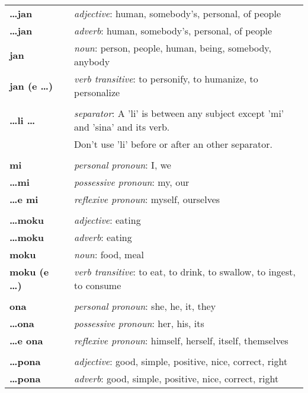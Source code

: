 \begin{supertabular}{p{2,5cm}|ll}
\textbf{\dots jan} && \textit{adjective}: human, somebody's, personal, of people \\ %
\textbf{\dots jan} && \textit{adverb}: human, somebody's, personal, of people \\ %
\textbf{jan} && \textit{noun}: person, people, human, being, somebody, anybody \\ %
\textbf{jan (e \dots)} && \textit{verb transitive}: to personify, to humanize, to personalize \\ %
 && \\ %
\textbf{\dots li \dots} && \textit{separator}: A 'li' is between any subject except 'mi' and 'sina' and its verb. \\ && Don't use 'li' before or after an other separator. \\ %
 && \\ %
\textbf{mi} && \textit{personal pronoun}: I, we  \\ 
\textbf{\dots mi} && \textit{possessive pronoun}: my, our \\  
\textbf{\dots e mi} && \textit{reflexive pronoun}: myself, ourselves  \\ 
 && \\ %
\textbf{\dots moku} && \textit{adjective}: eating \\ %
\textbf{\dots moku} && \textit{adverb}: eating \\ %
\textbf{moku} && \textit{noun}: food, meal \\ %
\textbf{moku (e \dots)} && \textit{verb transitive}: to eat, to drink, to swallow, to ingest, to consume \\ %
 && \\ %
\textbf{ona} && \textit{personal pronoun}: she, he, it, they \\ %
\textbf{\dots ona} && \textit{possessive pronoun}: her, his, its \\  %
\textbf{\dots e ona} && \textit{reflexive pronoun}: himself, herself, itself, themselves \\  
 && \\ %
\textbf{\dots pona} && \textit{adjective}: good, simple, positive, nice, correct, right \\ %
\textbf{\dots pona} && \textit{adverb}: good, simple, positive, nice, correct, right \\ %

\end{supertabular}
